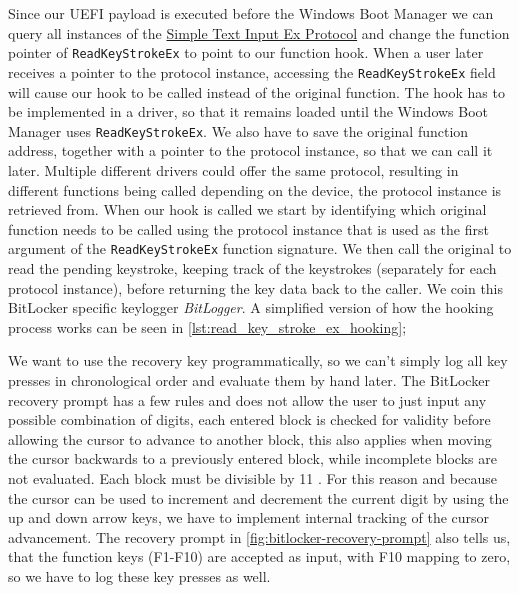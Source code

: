 Since our \ac{UEFI} payload is executed before the Windows Boot Manager we can query all instances of the \hyperref[lst:simple-text-input-ex-protocol]{Simple Text Input Ex Protocol} and change the function pointer of \lstinline{ReadKeyStrokeEx} to point to our function hook.
When a user later receives a pointer to the protocol instance, accessing the \lstinline{ReadKeyStrokeEx} field will cause our hook to be called instead of the original function.
The hook has to be implemented in a driver, so that it remains loaded until the Windows Boot Manager uses \lstinline{ReadKeyStrokeEx}.
We also have to save the original function address, together with a pointer to the protocol instance, so that we can call it later.
Multiple different drivers could offer the same protocol, resulting in different functions being called depending on the device, the protocol instance is retrieved from.
When our hook is called we start by identifying which original function needs to be called using the protocol instance that is used as the first argument of the \lstinline{ReadKeyStrokeEx} function signature.
We then call the original to read the pending keystroke, keeping track of the keystrokes (separately for each protocol instance), before returning the key data back to the caller.
We coin this BitLocker specific keylogger \emph{BitLogger}. A simplified version of how the hooking process works can be seen in \autoref{lst:read_key_stroke_ex_hooking};



We want to use the recovery key programmatically, so we can't simply log all key presses in chronological order and evaluate them by hand later.
The BitLocker recovery prompt has a few rules and does not allow the user to just input any possible combination of digits, each entered block is checked for validity before allowing the cursor to advance to another block, this also applies when moving the cursor backwards to a previously entered block, while incomplete blocks are not evaluated.
Each block must be divisible by 11 \cite[Section 9]{windows-internals-6-part2}.
For this reason and because the cursor can be used to increment and decrement the current digit by using the up and down arrow keys, we have to implement internal tracking of the cursor advancement.
The recovery prompt in \autoref{fig:bitlocker-recovery-prompt} also tells us, that the function keys (F1-F10) are accepted as input, with F10 mapping to zero, so we have to log these key presses as well.

